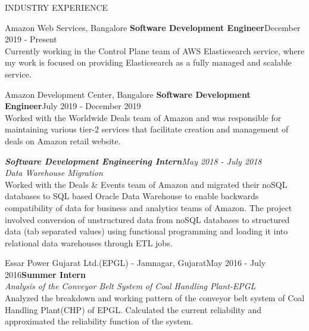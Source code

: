 \documentclass{resume} %
\begin{document}
\begin{rSection}{INDUSTRY EXPERIENCE}

\begin{rSubsection}{Amazon Web Services, Bangalore}{}
{\textbf{Software Development Engineer}}{December 2019 - Present}
\\ Currently working in the Control Plane team of AWS Elasticsearch service, where my work is focused on providing Elasticsearch as a fully managed and scalable service.
 
\end{rSubsection} 

\begin{rSubsection}{Amazon Development Center, Bangalore}{}
{\textbf{Software Development Engineer}}{July 2019 - December 2019}
\\ Worked with the Worldwide Deals team of Amazon and was responsible for maintaining various tier-2 services that facilitate creation and management of deals on Amazon retail website.
 
{\textbf{\textit{Software Development Engineering Intern}}}{\hfill \textit{May 2018 - July 2018}}
\\{\textit {Data Warehouse Migration}}
\\ Worked with the Deals \& Events team of Amazon and migrated their noSQL databases to SQL based Oracle Data Warehouse to enable backwards compatibility of data for business and analytics teams of Amazon. The project involved conversion of unstructured data from noSQL databases to structured data (tab separated values) using functional programming and loading it into relational data warehouses through ETL jobs. 
 
\end{rSubsection} 



\begin{rSubsection}{Essar Power Gujarat Ltd.(EPGL) - Jamnagar, Gujarat}{May 2016 - July 2016}{\textbf{Summer Intern}}{}
\\{\textit{Analysis of the Conveyor Belt System of Coal Handling Plant-EPGL}}
\\ Analyzed the breakdown and working pattern of the conveyor belt system of Coal Handling Plant(CHP) of EPGL.
Calculated the current reliability and approximated the reliability function of the system. 
\end{rSubsection}
\end{rSection} 
\end{document}

